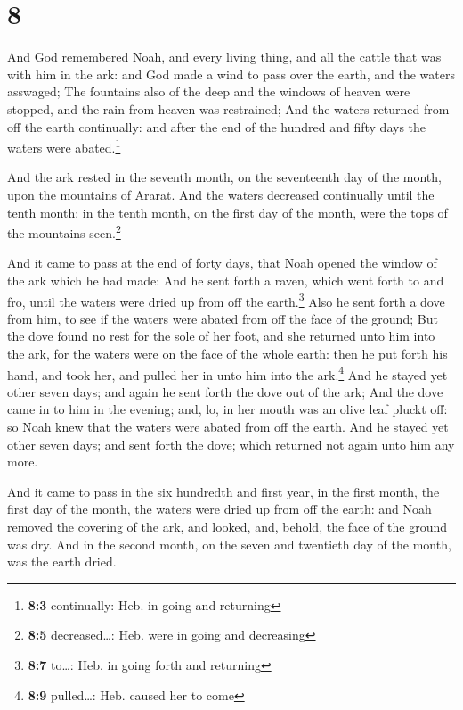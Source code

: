 \hypertarget{section-7}{%
\section{8}\label{section-7}}

 And God remembered Noah, and every living thing, and all
the cattle that was with him in the ark: and God made a wind to pass
over the earth, and the waters asswaged;  The fountains
also of the deep and the windows of heaven were stopped, and the rain
from heaven was restrained;  And the waters returned from
off the earth continually: and after the end of the hundred and fifty
days the waters were abated.\footnote{\textbf{8:3} continually: Heb. in
  going and returning}

 And the ark rested in the seventh month, on the
seventeenth day of the month, upon the mountains of Ararat.
 And the waters decreased continually until the tenth
month: in the tenth month, on the first day of the month, were the tops
of the mountains seen.\footnote{\textbf{8:5} decreased\ldots: Heb. were
  in going and decreasing}

 And it came to pass at the end of forty days, that Noah
opened the window of the ark which he had made:  And he
sent forth a raven, which went forth to and fro, until the waters were
dried up from off the earth.\footnote{\textbf{8:7} to\ldots: Heb. in
  going forth and returning}  Also he sent forth a dove
from him, to see if the waters were abated from off the face of the
ground;  But the dove found no rest for the sole of her
foot, and she returned unto him into the ark, for the waters were on the
face of the whole earth: then he put forth his hand, and took her, and
pulled her in unto him into the ark.\footnote{\textbf{8:9} pulled\ldots:
  Heb. caused her to come}  And he stayed yet other seven
days; and again he sent forth the dove out of the ark; 
And the dove came in to him in the evening; and, lo, in her mouth was an
olive leaf pluckt off: so Noah knew that the waters were abated from off
the earth.  And he stayed yet other seven days; and sent
forth the dove; which returned not again unto him any more.

 And it came to pass in the six hundredth and first year,
in the first month, the first day of the month, the waters were dried up
from off the earth: and Noah removed the covering of the ark, and
looked, and, behold, the face of the ground was dry.  And
in the second month, on the seven and twentieth day of the month, was
the earth dried.

